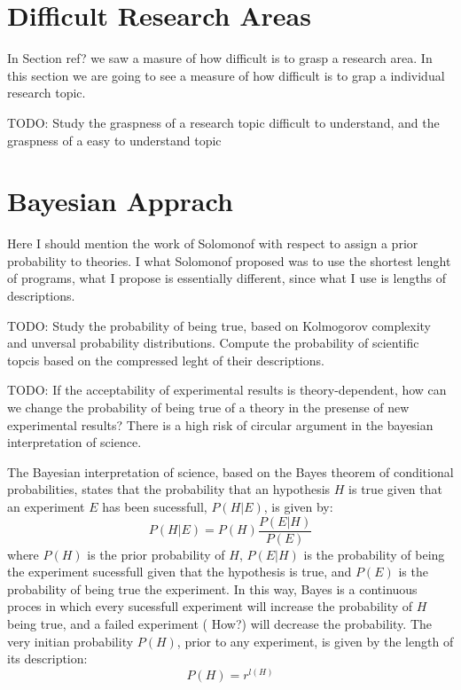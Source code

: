 %
%
\section{Difficult Research Areas}

In Section {\color{red} ref?} we saw a masure of how difficult is to grasp a research area. In this section we are going to see a measure of how difficult is to grap a individual research topic.

{\color{red} TODO: Study the graspness of a research topic difficult to understand, and the graspness of a easy to understand topic}

%
%
\section{Bayesian Apprach}

Here I should mention the work of Solomonof with respect to assign a prior probability to theories. I what Solomonof proposed was to use the shortest lenght of programs, what I propose is essentially different, since what I use is lengths of descriptions.


{\color{red} TODO: Study the probability of being true, based on Kolmogorov complexity and unversal probability distributions. Compute the probability of scientific topcis based on the compressed leght of their descriptions.}

{\color{red} TODO: If the acceptability of experimental results is theory-dependent, how can we change the probability of being true of a theory in the presense of new experimental results? There is a high risk of circular argument in the bayesian interpretation of science.}

The Bayesian interpretation of science, based on the Bayes theorem of conditional probabilities, states that the probability that an hypothesis $H$ is true given that an experiment $E$ has been sucessfull, $P(H|E)$, is given by:
\[
P(H|E) = P(H) \frac{ P(E|H) }{ P(E) }
\]
where $P(H)$ is the prior probability of $H$, $P(E|H)$ is the probability of being the experiment sucessfull given that the hypothesis is true, and $P(E)$ is the probability of being true the experiment. In this way, Bayes is a continuous proces in which every sucessfull experiment will increase the probability of $H$ being true, and a failed experiment ({\color{red} How?}) will decrease the probability. The very initian probability $P(H)$, prior to any experiment, is given by the length of its description:
\[
P(H) = r^{l(H)}
\]

